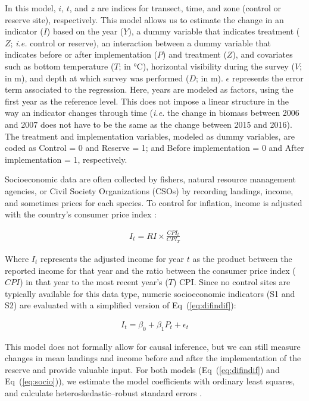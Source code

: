 \documentclass[10pt,letterpaper]{article}
\begin{document}
In this model, \(i\), \(t\), and \(z\) are indices for transect, time, and zone (control or reserve site), respectively. This model allows us to estimate the change in an indicator (\(I\)) based on the year (\(Y\)), a dummy variable that indicates treatment (\(Z\); \emph{i.e.} control or reserve), an interaction between a dummy variable that indicates before or after implementation (\(P\)) and treatment (\(Z\)), and covariates such as bottom temperature (\(T\); in °C), horizontal visibility during the survey (\(V\); in m), and depth at which survey was performed (\(D\); in m). \(\epsilon\) represents the error term associated to the regression. Here, years are modeled as factors, using the first year as the reference level. This does not impose a linear structure in the way an indicator changes through time (\emph{i.e.} the change in biomass between 2006 and 2007 does not have to be the same as the change between 2015 and 2016). The treatment and implementation variables, modeled as dummy variables, are coded as Control = 0 and Reserve = 1; and Before implementation = 0 and After implementation = 1, respectively.

Socioeconomic data are often collected by fishers, natural resource management agencies, or Civil Society Organizations (CSOs) by recording landings, income, and sometimes prices for each species. To control for inflation, income is adjusted with the country's consumer price index \cite{oecd_2017-VV}:

\begin{eqnarray}
\label{eq:cpi}
I_t = RI\times \frac{CPI_t}{CPI_T}
\end{eqnarray}

Where \(I_t\) represents the adjusted income for year \(t\) as the product between the reported income for that year and the ratio between the consumer price index (\(CPI\)) in that year to the most recent year's (\(T\)) CPI. Since no control sites are typically available for this data type, numeric socioeconomic indicators (S1 and S2) are evaluated with a simplified version of Eq~(\ref{eq:difindif}):

\begin{eqnarray}
\label{eq:socio}
I_{t}=\beta_0 + \beta_1P_{t} + \epsilon_{t}
\end{eqnarray}

This model does not formally allow for causal inference, but we can still measure changes in mean landings and income before and after the implementation of the reserve and provide valuable input. For both models (Eq~(\ref{eq:difindif}) and Eq~(\ref{eq:socio})), we estimate the model coefficients with ordinary least squares, and calculate heteroskedastic--robust standard errors \cite{zeileis_2004-7n}.
\end{document}
